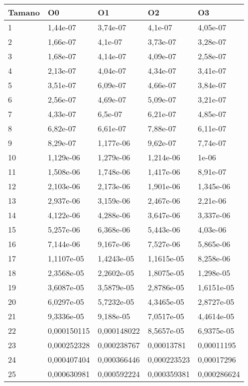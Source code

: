 \begin{tabular}{|l|l|l|l|l|}
	\hline
	Tamano & O0 & O1 & O2 & O3 \\
	\hline
	\hline
	1 & 1,44e-07 & 3,74e-07 & 4,1e-07 & 4,05e-07 \\
	\hline
	2 & 1,66e-07 & 4,1e-07 & 3,73e-07 & 3,28e-07 \\
	\hline
	3 & 1,68e-07 & 4,14e-07 & 4,09e-07 & 2,58e-07 \\
	\hline
	4 & 2,13e-07 & 4,04e-07 & 4,34e-07 & 3,41e-07 \\
	\hline
	5 & 3,51e-07 & 6,09e-07 & 4,66e-07 & 3,84e-07 \\
	\hline
	6 & 2,56e-07 & 4,69e-07 & 5,09e-07 & 3,21e-07 \\
	\hline
	7 & 4,33e-07 & 6,5e-07 & 6,21e-07 & 4,85e-07 \\
	\hline
	8 & 6,82e-07 & 6,61e-07 & 7,88e-07 & 6,11e-07 \\
	\hline
	9 & 8,29e-07 & 1,177e-06 & 9,62e-07 & 7,74e-07 \\
	\hline
	10 & 1,129e-06 & 1,279e-06 & 1,214e-06 & 1e-06 \\
	\hline
	11 & 1,508e-06 & 1,748e-06 & 1,417e-06 & 8,91e-07 \\
	\hline
	12 & 2,103e-06 & 2,173e-06 & 1,901e-06 & 1,345e-06 \\
	\hline
	13 & 2,937e-06 & 3,159e-06 & 2,467e-06 & 2,21e-06 \\
	\hline
	14 & 4,122e-06 & 4,288e-06 & 3,647e-06 & 3,337e-06 \\
	\hline
	15 & 5,257e-06 & 6,368e-06 & 5,443e-06 & 4,03e-06 \\
	\hline
	16 & 7,144e-06 & 9,167e-06 & 7,527e-06 & 5,865e-06 \\
	\hline
	17 & 1,1107e-05 & 1,4243e-05 & 1,1615e-05 & 8,258e-06 \\
	\hline
	18 & 2,3568e-05 & 2,2602e-05 & 1,8075e-05 & 1,298e-05 \\
	\hline
	19 & 3,6087e-05 & 3,5879e-05 & 2,8786e-05 & 1,6151e-05 \\
	\hline
	20 & 6,0297e-05 & 5,7232e-05 & 4,3465e-05 & 2,8727e-05 \\
	\hline
	21 & 9,3336e-05 & 9,188e-05 & 7,0517e-05 & 4,4614e-05 \\
	\hline
	22 & 0,000150115 & 0,000148022 & 8,5657e-05 & 6,9375e-05 \\
	\hline
	23 & 0,000252328 & 0,000238767 & 0,00013781 & 0,00011195 \\
	\hline
	24 & 0,000407404 & 0,000366446 & 0,000223523 & 0,00017296 \\
	\hline
	25 & 0,000630981 & 0,000592224 & 0,000359381 & 0,000286624 \\
	\hline
\end{tabular}
